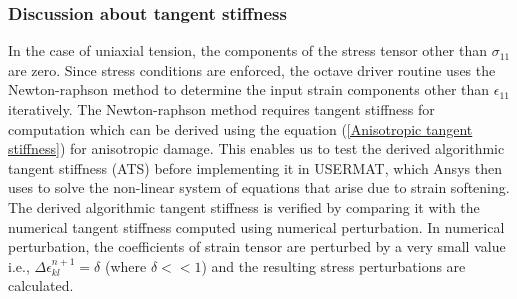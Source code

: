\documentclass[a4paper,12pt,twoside]{report}
\begin{document}
\subsubsection{Discussion about tangent stiffness}
\indent\indent\indent In the case of uniaxial tension, the components of the stress tensor other than $\sigma_{11}$ are zero. Since stress conditions are enforced, the octave driver routine uses the Newton-raphson method to determine the input strain components other than $\epsilon_{11}$ iteratively. The Newton-raphson method requires tangent stiffness for computation which can be derived using the equation (\ref{Anisotropic tangent stiffness}) for anisotropic damage. This enables us to test the derived algorithmic tangent stiffness (ATS) before implementing it in USERMAT, which Ansys then uses to solve the non-linear system of equations that arise due to strain softening. The derived algorithmic tangent stiffness is verified by comparing it with the numerical tangent stiffness computed using numerical perturbation. In numerical perturbation, the coefficients of strain tensor are perturbed by a very small value i.e.,  $\Delta\epsilon_{kl}^{n+1} = \delta$ (where $\delta<<1$) and the resulting stress perturbations are calculated. 
\end{document}
